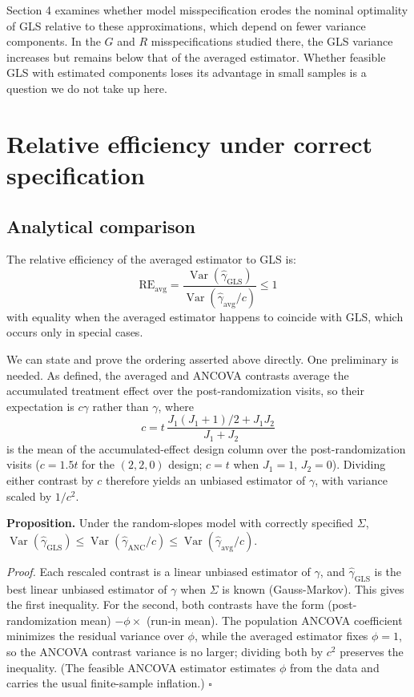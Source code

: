 \documentclass[
  11pt,
]{article}
\begin{document}
Section 4 examines whether model misspecification erodes
the nominal optimality of GLS relative to these
approximations, which depend on fewer variance
components. In the \(G\) and \(R\) misspecifications studied
there, the GLS variance increases but remains below
that of the averaged estimator. Whether feasible GLS
with estimated components loses its advantage in small
samples is a question we do not take up here.

\section{Relative efficiency under correct specification}\label{relative-efficiency-under-correct-specification}

\subsection{Analytical comparison}\label{analytical-comparison}

The relative efficiency of the averaged estimator
to GLS is:
\begin{equation}
  \text{RE}_{\text{avg}} =
    \frac{\mathop{\mathrm{Var}}(\hat\gamma_{\text{GLS}})}
         {\mathop{\mathrm{Var}}(\hat\gamma_{\text{avg}}/c)}
    \le 1
\end{equation}
with equality when the averaged estimator happens to
coincide with GLS, which occurs only in special cases.

We can state and prove the ordering asserted above
directly. One preliminary is needed. As defined, the
averaged and ANCOVA contrasts average the accumulated
treatment effect over the post-randomization visits, so
their expectation is \(c\gamma\) rather than \(\gamma\),
where
\begin{equation}
  c = t\,\frac{J_1(J_1 + 1)/2 + J_1 J_2}{J_1 + J_2}
\end{equation}
is the mean of the accumulated-effect design column over
the post-randomization visits (\(c = 1.5t\) for the
\((2,2,0)\) design; \(c = t\) when \(J_1 = 1\), \(J_2 = 0\)).
Dividing either contrast by \(c\) therefore yields an
unbiased estimator of \(\gamma\), with variance scaled by
\(1/c^2\).

\textbf{Proposition.} Under the random-slopes model with
correctly specified \(\Sigma\),
\(\mathop{\mathrm{Var}}(\hat\gamma_{\text{GLS}}) \le
\mathop{\mathrm{Var}}(\hat\gamma_{\text{ANC}}/c) \le
\mathop{\mathrm{Var}}(\hat\gamma_{\text{avg}}/c)\).

\emph{Proof.} Each rescaled contrast is a linear unbiased
estimator of \(\gamma\), and \(\hat\gamma_{\text{GLS}}\) is
the best linear unbiased estimator of \(\gamma\) when
\(\Sigma\) is known (Gauss-Markov). This gives the first
inequality. For the second, both contrasts have the form
(post-randomization mean) \(- \phi \times\) (run-in mean).
The population ANCOVA coefficient minimizes the residual
variance over \(\phi\), while the averaged estimator fixes
\(\phi = 1\), so the ANCOVA contrast variance is no
larger; dividing both by \(c^2\) preserves the inequality.
(The feasible ANCOVA estimator estimates \(\phi\) from the
data and carries the usual finite-sample inflation.)
\(\square\)
\end{document}
